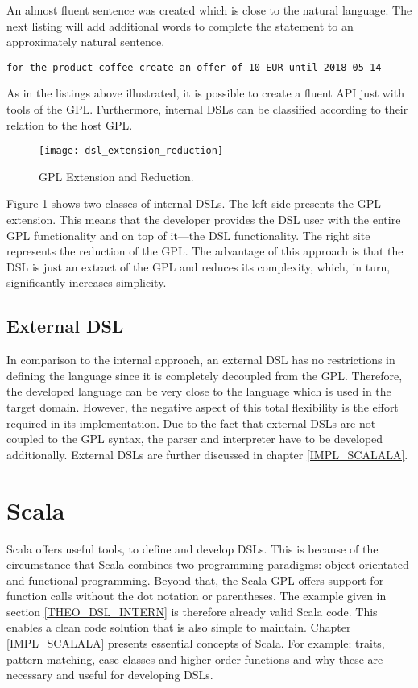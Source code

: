 An almost fluent sentence was created which is close to the natural language. The next listing will add additional words to complete the statement to an approximately natural sentence.

\begin{center}
\texttt{for the product coffee create an offer of 10 EUR until 2018-05-14}
\end{center}

As in the listings above illustrated, it is possible to create a fluent API just with tools of the GPL. Furthermore, internal DSLs can be classified according to their relation to the host GPL.

\begin{figure}[h]
\caption{GPL Extension and Reduction.\cite{Fleming2015}}
\label{IMG_DSL-RED-EXT}
\texttt{[image: dsl\_extension\_reduction]}
\end{figure}

Figure \ref{IMG_DSL-RED-EXT} shows two classes of internal DSLs. The left side presents the GPL extension. This means that the developer provides the DSL user with the entire GPL functionality and on top of it—the DSL functionality. The right site represents the reduction of the GPL. The advantage of this approach is that the DSL is just an extract of the GPL and reduces its complexity, which, in turn, significantly increases simplicity.\cite{Schmitt2014}

\subsection{External DSL}
\label{THEO_DSL_EXTERN}
In comparison to the internal approach, an external DSL has no restrictions in defining the language since it is completely decoupled from the GPL. Therefore, the developed language can be very close to the language which is used in the target domain. However, the negative aspect of this total flexibility is the effort required in its implementation. Due to the fact that external DSLs are not coupled to the GPL syntax, the parser and interpreter have to be developed additionally. External DSLs are further discussed in chapter \ref{IMPL_SCALALA}.


\section{Scala}
\label{THEO_SCALA}
Scala offers useful tools, to define and develop DSLs. This is because of the circumstance that Scala combines two programming paradigms: object orientated and functional programming. Beyond that, the Scala GPL offers support for function calls without the dot notation or parentheses. The example given in section \ref{THEO_DSL_INTERN} is therefore already valid Scala code. This enables a clean code solution that is also simple to maintain.\cite{Riti2018} Chapter \ref{IMPL_SCALALA} presents essential concepts of Scala. For example: traits, pattern matching, case classes and higher-order functions and why these are necessary and useful for developing DSLs.

